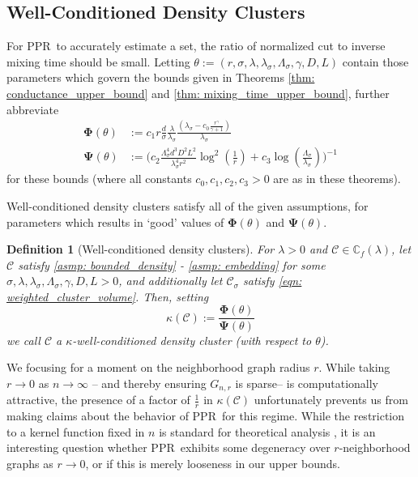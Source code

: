 \documentclass{article}
\newcommand{\1}{\mathbf{1}}
\newcommand{\Phibf}{\mathbf{\Phi}}
\newcommand{\Psibf}{\mathbf{\Psi}}
\newcommand{\Cbb}{\mathbb{C}}
\newcommand{\Cset}{\mathcal{C}}
\newcommand{\Csig}{\Cset_{\sigma}}
\newcommand{\pprspace}{{\sc PPR~}}
\theoremstyle{aldenthm}
\newtheorem{definition}{Definition}
\theoremstyle{aldenrmrk}
\begin{document}
\subsection{Well-Conditioned Density Clusters}

For \pprspace to accurately estimate a set, the ratio of normalized cut to inverse mixing time should be small. Letting $\theta := (r, \sigma, \lambda, \lambda_{\sigma}, \Lambda_{\sigma}, \gamma, D, L)$ contain those parameters which govern the bounds given in Theorems \ref{thm: conductance_upper_bound} and \ref{thm: mixing_time_upper_bound}, further abbreviate
\begin{align*}
\mathbf{\Phi}(\theta) 
& := c_1 r \frac{d}{\sigma} \frac{\lambda}{\lambda_{\sigma}} \frac{(\lambda_{\sigma} - c_0 \frac{r^{\gamma}}{\gamma + 1})}{\lambda_{\sigma}} \\
\mathbf{\Psi}(\theta) & := \Biggl(c_2 \frac{\Lambda_{\sigma}^4 d^3 D^2 L^2}{\lambda_{\sigma}^4 r^2} \log^2\left(\frac{1}{r}\right) + c_3 \log\left(\frac{\Lambda_{\sigma}}{\lambda_{\sigma}}\right) \Biggr)^{-1}
\end{align*}
for these bounds (where all constants $c_0,c_1,c_2,c_3 >0$ are as in these theorems).

Well-conditioned density clusters satisfy all of the given assumptions, for parameters which results in `good' values of $\Phibf(\theta)$ and $\Psibf(\theta)$.
\begin{definition}[Well-conditioned density clusters]
	For $\lambda > 0$ and $\Cset \in \Cbb_f(\lambda)$, let $\Cset$ satisfy \ref{asmp: bounded_density} - \ref{asmp: embedding} for some $\sigma, \lambda, \lambda_{\sigma}, \Lambda_{\sigma}, \gamma, D, L > 0$, and additionally let $\Csig$ satisfy \eqref{eqn: weighted_cluster_volume}. Then, setting
	\begin{equation*}
	\kappa(\Cset) := \frac{\mathbf{\Phi}(\theta)}{\mathbf{\Psi}(\theta)}
	\end{equation*}
	we call $\Cset$ a \textrm{$\kappa$-well-conditioned density cluster (with respect to $\theta$).}
\end{definition}

We focusing for a moment on the neighborhood graph radius $r$. While taking $r \to 0$ as $n \to \infty$ -- and thereby ensuring $G_{n,r}$ is sparse-- is computationally attractive, the presence of a factor of $\frac{1}{r}$ in $\kappa(\Cset)$ unfortunately prevents us from making claims about the behavior of \pprspace for this regime. While the restriction to a kernel function fixed in $n$ is standard for theoretical analysis \cite{schiebinger2015,vonluxburg2008}, it is an interesting question whether \pprspace exhibits some degeneracy over $r$-neighborhood graphs as $r \to 0$, or if this is merely looseness in our upper bounds.
\end{document}
